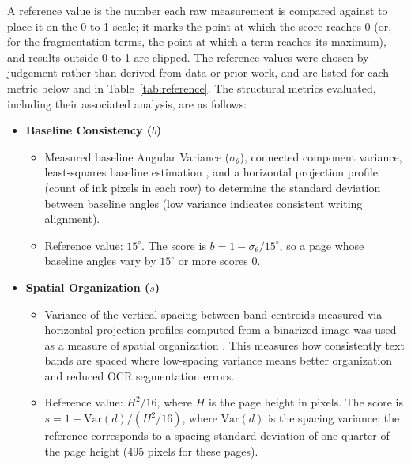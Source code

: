\documentclass[conference]{IEEEtran}
\begin{document}
A reference value is the number each raw measurement is compared against to
place it on the 0 to 1 scale; it marks the point at which the score reaches 0
(or, for the fragmentation terms, the point at which a term reaches its
maximum), and results outside 0 to 1 are clipped. The reference values were
chosen by judgement rather than derived from data or prior work, and are listed
for each metric below and in Table~\ref{tab:reference}.
The structural metrics evaluated, including their associated analysis, are as
follows:

\begin{itemize}
  \item \textbf{Baseline Consistency ($b$)}
  \begin{itemize}
    \item Measured baseline Angular Variance ($\sigma_\theta$), connected
    component variance, least-squares baseline estimation
    \cite{ogorman1993, opencv_shape}, and a horizontal projection profile
    (count of ink pixels in each row) \cite{likforman2007, papavassiliou2010}
    to determine the standard deviation between baseline angles (low variance
    indicates consistent writing alignment).
    \item Reference value: $15^\circ$. The score is
    $b = 1 - \sigma_\theta / 15^\circ$, so a page whose baseline angles vary by
    $15^\circ$ or more scores 0.
  \end{itemize}

  \item \textbf{Spatial Organization ($s$)}
  \begin{itemize}
    \item Variance of the vertical spacing between band centroids measured via
    horizontal projection profiles computed from a binarized image was used as
    a measure of spatial organization \cite{likforman2007}. This measures how
    consistently text bands are spaced where low-spacing variance means better
    organization and reduced OCR segmentation errors.

    \item Reference value: $H^2/16$, where $H$ is the page height in pixels.
    The score is $s = 1 - \mathrm{Var}(d) / (H^2/16)$, where $\mathrm{Var}(d)$
    is the spacing variance; the reference corresponds to a spacing standard
    deviation of one quarter of the page height (495 pixels for these pages).
  \end{itemize}


\end{itemize}
\end{document}
